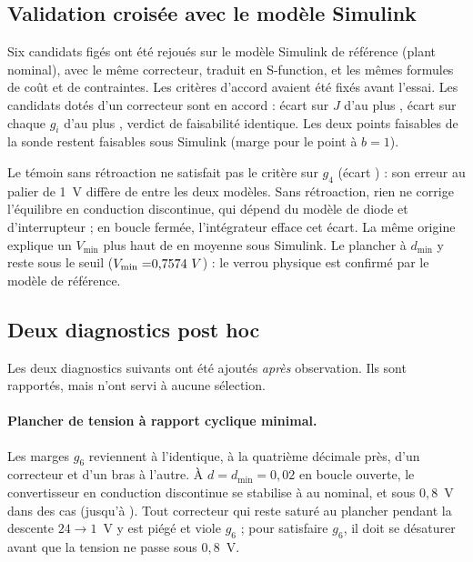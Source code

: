 \subsection{Validation croisée avec le modèle Simulink}

Six candidats figés ont été rejoués sur le modèle Simulink de référence (plant
nominal), avec le même correcteur, traduit en S-function, et les mêmes
formules de coût et de contraintes. Les critères d'accord avaient été fixés
avant l'essai. Les \ChiffreXvalN{} candidats dotés d'un correcteur sont en
accord : écart sur $J$ d'au plus \ChiffreXvalDJmax, écart sur chaque $g_i$
d'au plus \ChiffreXvalDgmax, verdict de faisabilité identique. Les deux points
faisables de la sonde restent faisables sous Simulink (marge
\ChiffreXvalMargeSl{} pour le point à $b=1$).

Le témoin sans rétroaction ne satisfait pas le critère sur $g_4$ (écart
\ChiffreXvalFFdg) : son erreur au palier de 1~V diffère de
\ChiffreXvalFFde{} entre les deux modèles. Sans rétroaction, rien ne corrige
l'équilibre en conduction discontinue, qui dépend du modèle de diode et
d'interrupteur ; en boucle fermée, l'intégrateur efface cet écart. La même
origine explique un $V_\mathrm{min}$ plus haut de \ChiffreXvalDVmin{} en
moyenne sous Simulink. Le plancher à $d_\mathrm{min}$ y reste sous le seuil
($V_\mathrm{min}=\ChiffreXvalVminSl$) : le verrou physique est confirmé par le
modèle de référence.

\subsection{Deux diagnostics post hoc}

Les deux diagnostics suivants ont été ajoutés \emph{après} observation. Ils
sont rapportés, mais n'ont servi à aucune sélection.

\paragraph{Plancher de tension à rapport cyclique minimal.}
Les marges $g_6$ reviennent à l'identique, à la quatrième décimale près,
d'un correcteur et d'un bras à l'autre. À $d=d_\mathrm{min}=0{,}02$ en boucle
ouverte, le convertisseur en conduction discontinue se stabilise à
\ChiffrePlancherNominal{} au nominal, et sous $0{,}8$~V dans
\ChiffrePlancherN{} des \ChiffrePlancherTot{} cas (jusqu'à
\ChiffrePlancherMin). Tout correcteur qui reste saturé au plancher pendant la
descente $24\to1$~V y est piégé et viole $g_6$ ; pour satisfaire $g_6$, il
doit se désaturer avant que la tension ne passe sous $0{,}8$~V.

